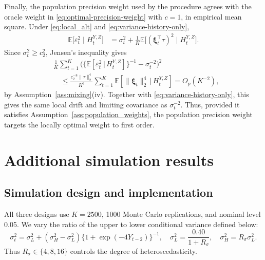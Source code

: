 \documentclass[12pt]{article}
\def\E{\mathbb{E}}
\newcommand\given{\,|\,}
\numberwithin{equation}{section}
\begin{document}
Finally, the population precision weight used by the procedure agrees with the oracle weight in \eqref{eq:optimal-precision-weight} with \(c=1\), in empirical mean square.
Under \eqref{eq:local_alt} and \eqref{eq:variance-history-only},
\begin{equation}
\begin{aligned}
    \E\big[
        \varepsilon_t^2
        \mid H_t^{Y,Z}
    \big]
    &=
    \sigma_t^2
    +
    \frac{1}{K}
    \E\big[
        (
            \boldsymbol{\xi}_t^\top\tau
        )^2
        \mid H_t^{Y,Z}
    \big].
\end{aligned}
\end{equation}
Since \(\sigma_t^2\geq c_2^2\), Jensen's inequality gives
\begin{equation}
\begin{aligned}
&\frac1K\sum_{t=1}^K
\Big(\big\{\E[\varepsilon_t^2\given H_t^{Y,Z}]\big\}^{-1}
-\sigma_t^{-2}\Big)^2\\
&\quad\leq\frac{c_2^{-8}\|\tau\|_2^4}{K^3}
\sum_{t=1}^K\E[\|\boldsymbol\xi_t\|_2^4\given H_t^{Y,Z}]
=O_p(K^{-2}),
\end{aligned}
\end{equation}
by Assumption~\ref{ass:mixing}(iv). Together with
\eqref{eq:variance-history-only}, this gives the same local drift and
limiting covariance as \(\sigma_t^{-2}\). Thus, provided it satisfies
Assumption~\ref{ass:population_weights}, the population precision weight
targets the locally optimal weight to first order.


\section{Additional simulation results}
\label{app:implementation}

\subsection{Simulation design and implementation}
\label{sec:simulation-common-details}

All three designs use \(K=2500\), 1000 Monte Carlo replications, and nominal level 0.05. We vary the ratio of the upper to lower conditional variance defined below:
\begin{equation}
\label{eq:simulation-variance-function}
\sigma_t^2=\sigma_L^2+(\sigma_H^2-\sigma_L^2)
\{1+\exp(-4Y_{t-2})\}^{-1},
\quad
\sigma_L^2=\frac{0.40}{1+R_\sigma},
\quad
\sigma_H^2=R_\sigma\sigma_L^2.
\end{equation}
Thus \(R_\sigma\in\{4,8,16\}\) controls the degree of heteroscedasticity.
\end{document}
